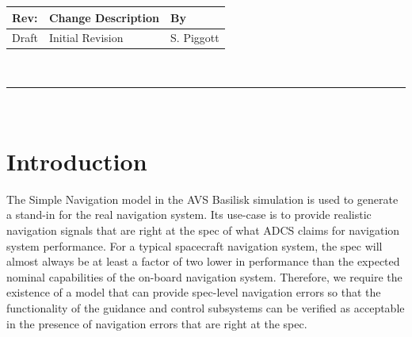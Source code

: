 \documentclass[]{LASPreport}
\begin{document}
\makeCover


%
%
\pagestyle{empty}
{\renewcommand{\arraystretch}{2}
\noindent
\begin{longtable}{|p{0.5in}|p{4.5in}|p{1.14in}|}
\hline
{\bfseries Rev}: & {\bfseries Change Description} & {\bfseries By} \\
\hline
Draft & Initial Revision & S. Piggott \\
\hline

\end{longtable}
}

\newpage
\setcounter{page}{1}
\pagestyle{fancy}

\tableofcontents
~\\ \hrule ~\\


\section{Introduction}
The Simple Navigation model in the AVS Basilisk simulation is used to generate 
a stand-in for the real navigation system.  Its use-case is to provide realistic 
navigation signals that are right at the spec of what ADCS claims for navigation 
system performance.  For a typical spacecraft navigation system, the spec will 
almost always be at least a factor of two lower in performance than the expected 
nominal capabilities of the on-board navigation system.  Therefore, we require 
the existence of a model that can provide spec-level navigation errors so that 
the functionality of the guidance and control subsystems can be verified as 
acceptable in the presence of navigation errors that are right at the spec. \\
\end{document}
